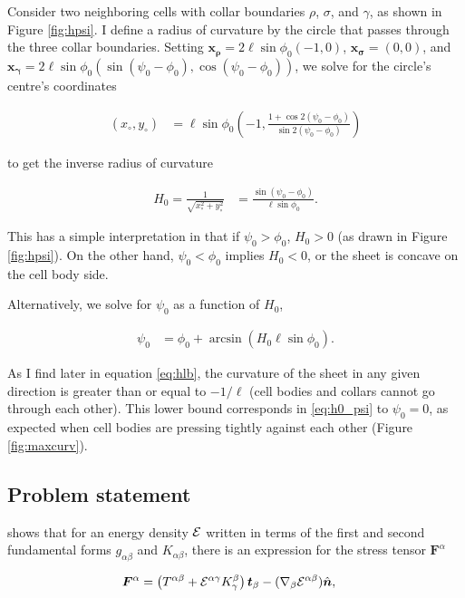 Consider two neighboring cells with collar boundaries $\rho$, $\sigma$, and $\gamma$, as shown in Figure \ref{fig:hpsi}. 
I define a radius of curvature by the circle that passes through the three collar boundaries. 
Setting $\bm{x_\rho} = 2\ell\sin\phi_0(-1, 0)$, $\bm{x_\sigma} = (0,0)$, and $\bm{x_\gamma} = 2\ell\sin\phi_0 (\sin(\psi_0 - \phi_0), \cos(\psi_0-\phi_0))$, we solve for the circle's centre's coordinates 

\begin{align*}
    (x_\circ, y_\circ) &= \ell \sin\phi_0\left(-1, \frac{1+\cos2(\psi_0 - \phi_0)}{\sin2(\psi_0 - \phi_0)} \right)
\end{align*}

\noindent to get the inverse radius of curvature 

\begin{align}
    H_0 = \frac{1}{\sqrt{x_\circ^2 + y_\circ^2}} &= \frac{\sin(\psi_0 - \phi_0)}{\ell \sin\phi_0}. \label{eq:h0}
\end{align}

This has a simple interpretation in that if $\psi_0 > \phi_0$, $H_0 > 0$ (as drawn in Figure \ref{fig:hpsi}). On the other hand, $\psi_0 < \phi_0$ implies $H_0 < 0$, or the sheet is concave on the cell body side. 

Alternatively, we solve for $\psi_0$ as a function of $H_0$,

\begin{align}
    \psi_0 &= \phi_0 + \arcsin \left( H_0 \ell \sin \phi_0 \right). \label{eq:h0_psi}
\end{align}

As I find later in equation \ref{eq:hlb}, the curvature of the sheet in any given direction is greater than or equal to $-1/\ell$ (cell bodies and collars cannot go through each other). 
This lower bound corresponds in \ref{eq:h0_psi} to $\psi_0 = 0$, as expected when cell bodies are pressing tightly against each other (Figure \ref{fig:maxcurv}).

\subsection{Problem statement} \label{subsec:problem}

\citet{powers2010} shows that for an energy density $\mathcal{E}$ written in terms of the first and second fundamental forms $g_{\alpha\beta}$ and $K_{\alpha\beta}$, there is an expression for the stress tensor $\bm{F}^\alpha$ 

\begin{align}
    \bm{F}^\alpha &= \left(T^{\alpha\beta} + \mathcal{E}^{\alpha\gamma}K_\gamma^\beta \right)\bm{t}_\beta - (\nabla_\beta \mathcal{E}^{\alpha\beta})\hat{\bm{n}}, \label{eq:stress}
\end{align}

